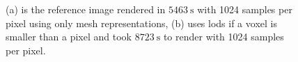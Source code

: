 \begin{figure}[ht]
\begin{subfigure}[b]{\linewidth}
{        }
        \caption{}
        \label{fig:render_comparison_mesh}
    \end{subfigure}
    \begin{subfigure}[b]{\linewidth}
        \caption{}
        \label{fig:render_comparison_lod}
    \end{subfigure}
	\caption[Comparison between mesh and volume renderings of the forest]{(a) is the reference image rendered in $\SI{5463}{\s}$ with 1024 samples per pixel using only mesh representations, (b) uses \acsp{lod} if a voxel is smaller than a pixel and took $\SI{8723}{\s}$ to render with 1024 samples per pixel.}
	\label{fig:render_comparison}
\end{figure}

